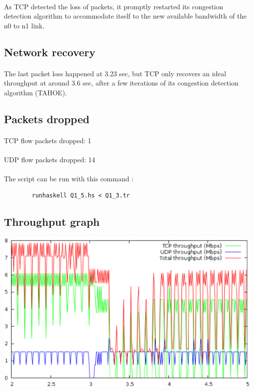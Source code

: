 \documentclass[a4paper]{article}
\begin{document}
    \paragraph{}As TCP detected the loss of packets, it promptly restarted its
congestion detection algorithm to accommodate itself to the new available
bandwidth of the n0 to n1 link.

   \subsection{Network recovery}
   \label{Network recovery}

   \paragraph{}The last packet loss happened at 3.23 sec, but TCP only recovers
an ideal throughput at around 3.6 sec, after a few iterations of its congestion
detection algorithm (TAHOE).

   \subsection{Packets dropped}

   \paragraph{}TCP flow packets dropped: 1
   \paragraph{}UDP flow packets dropped: 14

    \paragraph{}The script can be run with this command :
    \begin{verbatim}
        runhaskell Q1_5.hs < Q1_3.tr
    \end{verbatim}

   \subsection{Throughput graph}

    \begin{center}
        \includegraphics[width=\textwidth]{question1/Q1_6.eps}
    \end{center}
\end{document}
